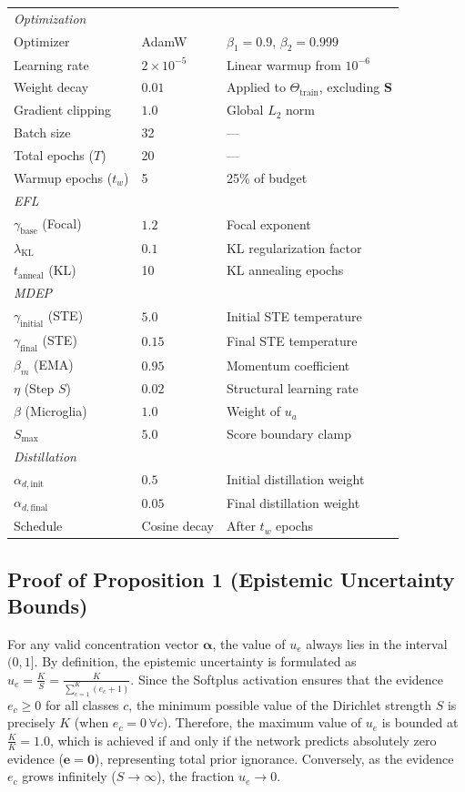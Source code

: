 \documentclass[letterpaper]{article} %
\begin{document}
\begin{table}[H]
\begin{tabular}{@{}lll@{}}
\midrule
\multicolumn{3}{l}{\emph{Optimization}} \\
Optimizer & AdamW~\cite{loshchilov2019decoupled, kingma2015adam} & $\beta_1=0.9$, $\beta_2=0.999$ \\
Learning rate & $2 \times 10^{-5}$ & Linear warmup from $10^{-6}$ \\
Weight decay & $0.01$ & Applied to $\Theta_{\text{train}}$, excluding $\bm{S}$ \\
Gradient clipping & $1.0$ & Global $L_2$ norm \\
Batch size & 32 & --- \\
Total epochs ($T$) & 20 & --- \\
Warmup epochs ($t_w$) & 5 & 25\% of budget \\
\midrule
\multicolumn{3}{l}{\emph{EFL}} \\
$\gamma_{\text{base}}$ (Focal) & $1.2$ & Focal exponent \\
$\lambda_{\text{KL}}$ & $0.1$ & KL regularization factor \\
$t_{\text{anneal}}$ (KL) & 10 & KL annealing epochs \\
\midrule
\multicolumn{3}{l}{\emph{MDEP}} \\
$\gamma_{\text{initial}}$ (STE) & $5.0$ & Initial STE temperature \\
$\gamma_{\text{final}}$ (STE) & $0.15$ & Final STE temperature \\
$\beta_m$ (EMA) & $0.95$ & Momentum coefficient \\
$\eta$ (Step $S$) & $0.02$ & Structural learning rate \\
$\beta$ (Microglia) & $1.0$ & Weight of $u_a$ \\
$S_{\max}$ & $5.0$ & Score boundary clamp \\
\midrule
\multicolumn{3}{l}{\emph{Distillation}} \\
$\alpha_{d,\text{init}}$ & $0.5$ & Initial distillation weight \\
$\alpha_{d,\text{final}}$ & $0.05$ & Final distillation weight \\
Schedule & Cosine decay & After $t_w$ epochs \\
\bottomrule
\end{tabular}
\end{table}


\subsection{Proof of Proposition 1 (Epistemic Uncertainty Bounds)}
For any valid concentration vector $\bm{\alpha}$, the value of $u_e$ always lies in the interval $(0, 1]$. By definition, the epistemic uncertainty is formulated as $u_e = \frac{K}{S} = \frac{K}{\sum_{c=1}^K (e_c + 1)}$. Since the Softplus activation ensures that the evidence $e_c \ge 0$ for all classes $c$, the minimum possible value of the Dirichlet strength $S$ is precisely $K$ (when $e_c = 0 \, \forall c$). Therefore, the maximum value of $u_e$ is bounded at $\frac{K}{K} = 1.0$, which is achieved if and only if the network predicts absolutely zero evidence ($\bm{e} = \bm{0}$), representing total prior ignorance. Conversely, as the evidence $e_c$ grows infinitely ($S \to \infty$), the fraction $u_e \to 0$.
\end{document}

